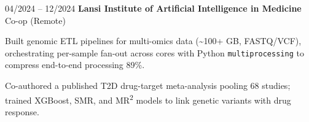 \begin{twocolentry}{04/2024 – 12/2024} \textbf{Lansi Institute of Artificial Intelligence in Medicine}
    \newline Co-op (Remote) \end{twocolentry}
\begin{onecolentry}
\begin{highlights}
\item Built genomic ETL pipelines for multi-omics data (\textasciitilde100+ GB, FASTQ/VCF), orchestrating per-sample fan-out across cores with Python \texttt{multiprocessing} to compress end-to-end processing 89\%.
\item Co-authored a published T2D drug-target meta-analysis pooling 68 studies; trained XGBoost, SMR, and MR\textsuperscript{2} models to link genetic variants with drug response.
\end{highlights}
\end{onecolentry}
